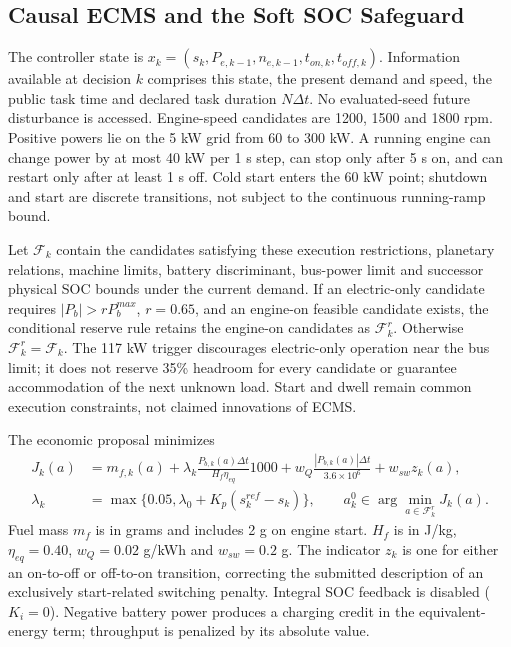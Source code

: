 \documentclass[energies,article,submit,moreauthors]{Definitions/mdpi}
\begin{document}
\subsection{Causal ECMS and the Soft SOC Safeguard}
The controller state is $x_k=(s_k,P_{e,k-1},n_{e,k-1},t_{on,k},t_{off,k})$. Information available at decision $k$ comprises this state, the present demand and speed, the public task time and declared task duration $N\Delta t$. No evaluated-seed future disturbance is accessed. Engine-speed candidates are 1200, 1500 and 1800 rpm. Positive powers lie on the 5 kW grid from 60 to 300 kW. A running engine can change power by at most 40 kW per 1 s step, can stop only after 5 s on, and can restart only after at least 1 s off. Cold start enters the 60 kW point; shutdown and start are discrete transitions, not subject to the continuous running-ramp bound.

Let $\mathcal{F}_k$ contain the candidates satisfying these execution restrictions, planetary relations, machine limits, battery discriminant, bus-power limit and successor physical SOC bounds under the current demand. If an electric-only candidate requires $|P_b|>rP_b^{max}$, $r=0.65$, and an engine-on feasible candidate exists, the conditional reserve rule retains the engine-on candidates as $\mathcal{F}^r_k$. Otherwise $\mathcal{F}^r_k=\mathcal{F}_k$. The 117 kW trigger discourages electric-only operation near the bus limit; it does not reserve 35\% headroom for every candidate or guarantee accommodation of the next unknown load. Start and dwell remain common execution constraints, not claimed innovations of ECMS.

The economic proposal minimizes
\begin{align}
 J_k(a)&=m_{f,k}(a)+\lambda_k\frac{P_{b,k}(a)\Delta t}{H_f\eta_{eq}}1000
       +w_Q\frac{|P_{b,k}(a)|\Delta t}{3.6\times10^6}+w_{sw}z_k(a),\label{eq:score}\\
 \lambda_k&=\max\{0.05,\lambda_0+K_p(s_k^{ref}-s_k)\},\qquad
 a_k^0\in\arg\min_{a\in\mathcal{F}^r_k}J_k(a).
\end{align}
Fuel mass $m_f$ is in grams and includes 2 g on engine start. $H_f$ is in J/kg, $\eta_{eq}=0.40$, $w_Q=0.02$ g/kWh and $w_{sw}=0.2$ g. The indicator $z_k$ is one for either an on-to-off or off-to-on transition, correcting the submitted description of an exclusively start-related switching penalty. Integral SOC feedback is disabled ($K_i=0$). Negative battery power produces a charging credit in the equivalent-energy term; throughput is penalized by its absolute value.
\end{document}
